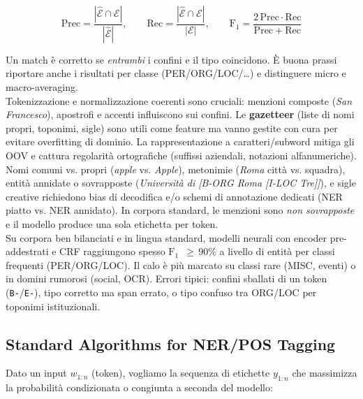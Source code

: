         $$
            \mathrm{Prec}=\frac{|\widehat{\mathcal{E}}\cap\mathcal{E}|}{|\widehat{\mathcal{E}}|},\qquad
            \mathrm{Rec}=\frac{|\widehat{\mathcal{E}}\cap\mathcal{E}|}{|\mathcal{E}|},\qquad            
            \mathrm{F}_1=\frac{2\,\mathrm{Prec}\cdot\mathrm{Rec}}{\mathrm{Prec}+\mathrm{Rec}}
        $$
        
        Un match è corretto se \emph{entrambi} i confini e il tipo coincidono. È buona prassi riportare anche i risultati per classe (PER/ORG/LOC/\dots) e distinguere micro e macro-averaging.\\
        
        Tokenizzazione e normalizzazione coerenti sono cruciali: menzioni composte (\textit{San Francesco}), apostrofi e accenti influiscono sui confini. Le \textbf{gazetteer} (liste di nomi propri, toponimi, sigle) sono utili come feature ma vanno gestite con cura per evitare overfitting di dominio. La rappresentazione a caratteri/subword mitiga gli OOV e cattura regolarità ortografiche (suffissi aziendali, notazioni alfanumeriche).\\
        
        Nomi comuni vs. propri (\textit{apple} vs. \textit{Apple}), metonimie (\textit{Roma} città vs. squadra), entità annidate o sovrapposte (\textit{Università di [B-ORG Roma [I-LOC Tre]]}), e sigle creative richiedono bias di decodifica e/o schemi di annotazione dedicati (NER piatto vs. NER annidato). In corpora standard, le menzioni sono \emph{non sovrapposte} e il modello produce una sola etichetta per token.\\
        
        Su corpora ben bilanciati e in lingua standard, modelli neurali con encoder pre-addestrati e CRF raggiungono spesso $\mathrm{F}_1$ \,$\ge$\,$90\%$ a livello di entità per classi frequenti (PER/ORG/LOC). Il calo è più marcato su classi rare (MISC, eventi) o in domini rumorosi (social, OCR). Errori tipici: confini sballati di un token (\texttt{B-}/\texttt{E-}), tipo corretto ma span errato, o tipo confuso tra ORG/LOC per toponimi istituzionali.

    \newpage

    \subsection{Standard Algorithms for NER/POS Tagging}

        Dato un input $w_{1:n}$ (token), vogliamo la sequenza di etichette $y_{1:n}$ che massimizza la probabilità condizionata o congiunta a seconda del modello:
        
